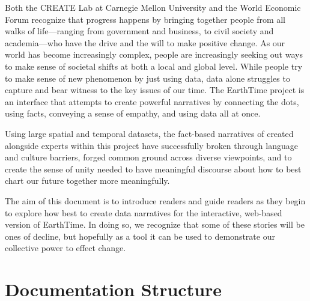 \documentclass[
]{book}
\begin{document}
Both the CREATE Lab at Carnegie Mellon University and the World Economic Forum recognize that progress happens by bringing together people from all walks of life---ranging from government and business, to civil society and academia---who have the drive and the will to make positive change. As our world has become increasingly complex, people are increasingly seeking out ways to make sense of societal shifts at both a local and global level. While people try to make sense of new phenomenon by just using data, data alone struggles to capture and bear witness to the key issues of our time. The EarthTime project is an interface that attempts to create powerful narratives by connecting the dots, using facts, conveying a sense of empathy, and using data all at once.

Using large spatial and temporal datasets, the fact-based narratives of created alongside experts within this project have successfully broken through language and culture barriers, forged common ground across diverse viewpoints, and to create the sense of unity needed to have meaningful discourse about how to best chart our future together more meaningfully.

The aim of this document is to introduce readers and guide readers as they begin to explore how best to create data narratives for the interactive, web-based version of EarthTime. In doing so, we recognize that some of these stories will be ones of decline, but hopefully as a tool it can be used to demonstrate our collective power to effect change.

\hypertarget{documentation-structure}{%
\section*{Documentation Structure}\label{documentation-structure}}
\end{document}
